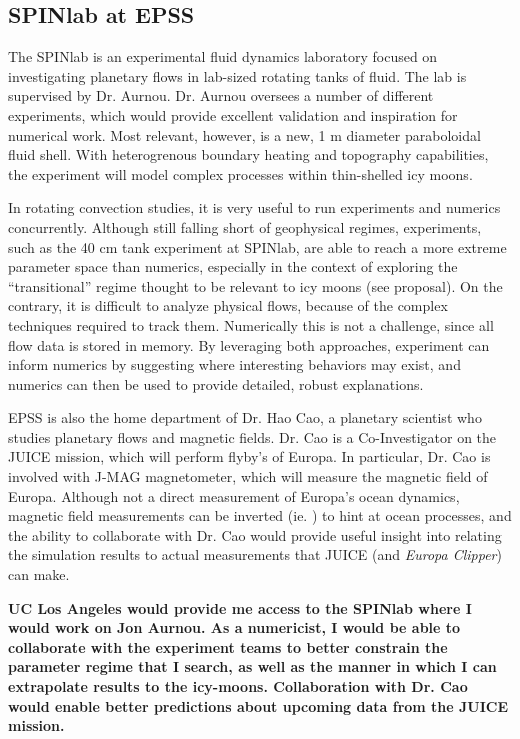 \documentclass[12pt]{article}
\title{}
\author{}
\date{}
\begin{document}
\pagestyle{fancy}
\thispagestyle{fancy}
\fancyhf{} %
\fancyhead[L]{\textcolor{red}{Tobias Oliver\\
		Rationale for University of California Los Angeles\\
Proposed Mentor: Professor Jon Aurnou}}
\fancyfoot[R]{\thepage}
\setlength{\headheight}{25pt}
\subsection*{SPINlab at EPSS}
The SPINlab is an experimental fluid dynamics laboratory focused on investigating planetary flows in lab-sized rotating tanks of fluid. The lab is supervised by Dr. Aurnou. Dr. Aurnou oversees a number of different experiments, which would provide excellent validation and inspiration for numerical work. Most relevant, however, is a new, 1 m diameter paraboloidal fluid shell. With heterogrenous boundary heating and topography capabilities, the experiment will model complex processes within thin-shelled icy moons.

In rotating convection studies, it is very useful to run experiments and numerics concurrently. Although still falling short of geophysical regimes, experiments, such as the 40 cm tank experiment\cite{jA23} at SPINlab, are able to reach a more extreme parameter space than numerics, especially in the context of exploring the ``transitional'' regime thought to be relevant to icy moons (see proposal). On the contrary, it is difficult to analyze physical flows, because of the complex techniques required to track them. Numerically this is not a challenge, since all flow data is stored in memory. By leveraging both approaches, experiment can inform numerics by suggesting where interesting behaviors may exist, and numerics can then be used to provide detailed, robust explanations.

EPSS is also the home department of Dr. Hao Cao, a planetary scientist who studies planetary flows and magnetic fields. Dr. Cao is a Co-Investigator on the JUICE mission, which will perform flyby's of Europa. In particular, Dr. Cao is involved with J-MAG magnetometer, which will measure the magnetic field of Europa.
Although not a direct measurement of Europa's ocean dynamics, magnetic field measurements can be inverted (ie. \cite{nG15,dJ88}) to hint at ocean processes, and the ability to collaborate with Dr. Cao would provide useful insight into relating the simulation results to actual measurements that JUICE (and \textit{Europa Clipper}) can make.

\textbf{UC Los Angeles would provide me access to the SPINlab where I would work on Jon Aurnou. As a numericist, I would be able to collaborate with the experiment teams to better constrain the parameter regime that I search, as well as the manner in which I can extrapolate results to the icy-moons. Collaboration with Dr. Cao would enable better predictions about upcoming data from the JUICE mission.}
\printbibliography
\end{document}
